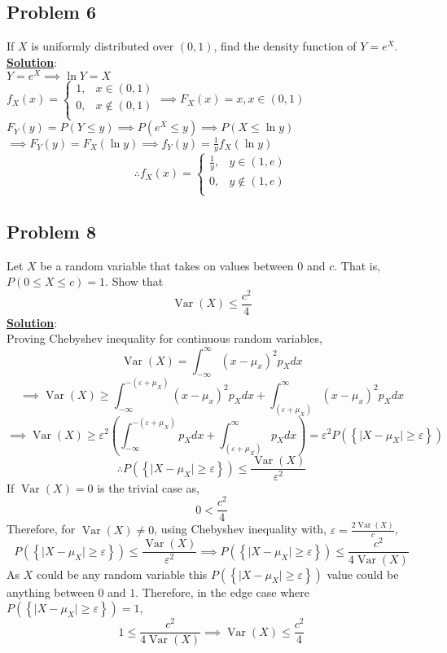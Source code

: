 \documentclass[11pt,letter paper]{report}
\begin{document}
\subsection*{Problem 6}
If $X$ is uniformly distributed over $(0,1)$, find the density function of $Y=e^X$. \\[0.1cm]
{\bf \underline{Solution}}:\\
$Y=e^X\implies \ln{Y}=X$\\
$f_X(x)=\begin{cases}
1, & x\in (0,1)\\
0, & x\not\in (0,1)\\
\end{cases}\implies F_X(x)=x, x\in(0,1)$\\
$F_Y(y)=P(Y\le y)\implies P(e^X\le y)\implies P(X\le \ln{y})$\\
$\implies F_Y(y)=F_X(\ln{y})\implies f_Y(y)=\frac{1}{y}f_X(\ln{y})$
$$\therefore f_X(x)=\begin{cases}
\frac{1}{y}, & y\in (1,e)\\
0, & y\not\in (1,e)\\
\end{cases}$$

\subsection*{Problem 8}
Let $X$ be a random variable that takes on values between $0$ and $c$. That is, $P(0\le X\le c)=1$. Show that
$$\operatorname{Var}(X)\leq \frac{c^2}{4}$$
{\bf \underline{Solution}}:\\
Proving Chebyshev inequality for continuous random variables,
$$\operatorname{Var}\left(X\right)=\int_{-\infty}^{\infty}\left(x-\mu_x\right)^2p_Xdx$$
$$\implies \operatorname{Var}\left(X\right)\ge\int_{-\infty}^{-(\varepsilon+\mu_X)}\left(x-\mu_x\right)^2p_Xdx+\int^{\infty}_{(\varepsilon+\mu_X)}\left(x-\mu_x\right)^2p_Xdx$$
$$\implies \operatorname{Var}\left(X\right)\ge\varepsilon^2\left(\int_{-\infty}^{-(\varepsilon+\mu_X)}p_Xdx+
\int^{\infty}_{(\varepsilon+\mu_X)}p_Xdx\right)=\varepsilon^2 P\left(\left\{\lvert X-\mu_X\rvert\ge\varepsilon \right\}\right)$$
$$\therefore P\left(\left\{\lvert X-\mu_X\rvert\ge\varepsilon \right\}\right)\le \frac{\operatorname{Var}(X)}{\varepsilon^2}$$
If $\operatorname{Var}(X)=0$ is the trivial case as,
$$0<\frac{c^2}{4}$$
Therefore, for $\operatorname{Var}(X)\not=0$, using Chebyshev inequality with, $\varepsilon=\frac{2\operatorname{Var}(X)}{c}$, 
$$P\left(\left\{\lvert X-\mu_X\rvert\ge\varepsilon \right\}\right)\le \frac{\operatorname{Var}(X)}{\varepsilon^2}\implies 
P\left(\left\{\lvert X-\mu_X\rvert\ge\varepsilon \right\}\right)\le \frac{c^2}{4\operatorname{Var}(X)}$$
As $X$ could be any random variable this $P\left(\left\{\lvert X-\mu_X\rvert\ge\varepsilon \right\}\right)$ value could be anything between $0$ and $1$. Therefore, in the edge case where $P\left(\left\{\lvert X-\mu_X\rvert\ge\varepsilon \right\}\right)=1$, 
$$1\le \frac{c^2}{4\operatorname{Var}(X)}\implies \operatorname{Var}(X)\le \frac{c^2}{4}$$
\end{document}

